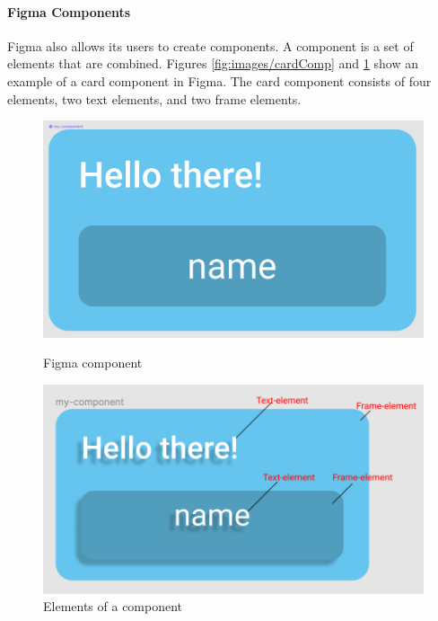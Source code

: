 \paragraph{Figma Components}%
\label{ssub:Figma Components}
Figma also allows its users to create components. A component is a set of elements that are combined. Figures \ref{fig:images/cardComp} and \ref{fig:images/cardCompElements} show an example of a card\cite{babichSimpleDesignTips2020} component in Figma. The card component consists of four elements, two text elements, and two frame elements. 

\begin{figure}[H]
  \centering
  \begin{minipage}[b]{0.48\textwidth}
    \includegraphics[width=\linewidth]{images/cardComp.png}
    \caption{Figma component}
    \label{fig:images/cardComp}
  \end{minipage}
  \hfill
  \begin{minipage}[b]{0.48\textwidth}
    \includegraphics[width=\linewidth]{images/cardCompElements.png}
    \caption{Elements of a component}
    \label{fig:images/cardCompElements}
  \end{minipage}
\end{figure}


